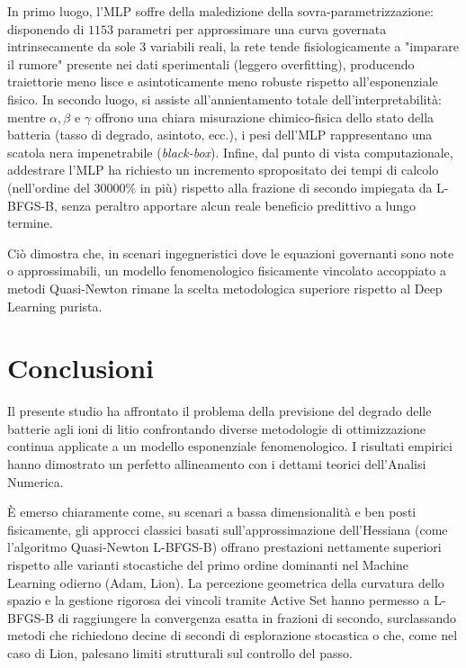 \documentclass[11pt, a4paper]{article}
\begin{document}
In primo luogo, l'MLP soffre della maledizione della sovra-parametrizzazione: disponendo di $1153$ parametri per approssimare una curva governata intrinsecamente da sole 3 variabili reali, la rete tende fisiologicamente a "imparare il rumore" presente nei dati sperimentali (leggero overfitting), producendo traiettorie meno lisce e asintoticamente meno robuste rispetto all'esponenziale fisico.
In secondo luogo, si assiste all'annientamento totale dell'interpretabilità: mentre $\alpha, \beta$ e $\gamma$ offrono una chiara misurazione chimico-fisica dello stato della batteria (tasso di degrado, asintoto, ecc.), i pesi dell'MLP rappresentano una scatola nera impenetrabile (\textit{black-box}).
Infine, dal punto di vista computazionale, addestrare l'MLP ha richiesto un incremento spropositato dei tempi di calcolo (nell'ordine del $30000\%$ in più) rispetto alla frazione di secondo impiegata da L-BFGS-B, senza peraltro apportare alcun reale beneficio predittivo a lungo termine.

Ciò dimostra che, in scenari ingegneristici dove le equazioni governanti sono note o approssimabili, un modello fenomenologico fisicamente vincolato accoppiato a metodi Quasi-Newton rimane la scelta metodologica superiore rispetto al Deep Learning purista.



\section{Conclusioni}

Il presente studio ha affrontato il problema della previsione del degrado delle batterie agli ioni di litio confrontando diverse metodologie di ottimizzazione continua applicate a un modello esponenziale fenomenologico. I risultati empirici hanno dimostrato un perfetto allineamento con i dettami teorici dell'Analisi Numerica.

È emerso chiaramente come, su scenari a bassa dimensionalità e ben posti fisicamente, gli approcci classici basati sull'approssimazione dell'Hessiana (come l'algoritmo Quasi-Newton L-BFGS-B) offrano prestazioni nettamente superiori rispetto alle varianti stocastiche del primo ordine dominanti nel Machine Learning odierno (Adam, Lion). La percezione geometrica della curvatura dello spazio e la gestione rigorosa dei vincoli tramite Active Set hanno permesso a L-BFGS-B di raggiungere la convergenza esatta in frazioni di secondo, surclassando metodi che richiedono decine di secondi di esplorazione stocastica o che, come nel caso di Lion, palesano limiti strutturali sul controllo del passo.
\end{document}
